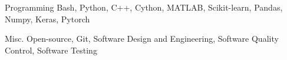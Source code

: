 \begin{cvskills}

  \cvskill
    {Programming} %
    {Bash, Python, C++, Cython, MATLAB, Scikit-learn, Pandas, Numpy, Keras, Pytorch} %
    
  \cvskill
    {Misc.} %
    {Open-source, Git, Software Design and Engineering, Software Quality Control, Software Testing} %

\end{cvskills}
